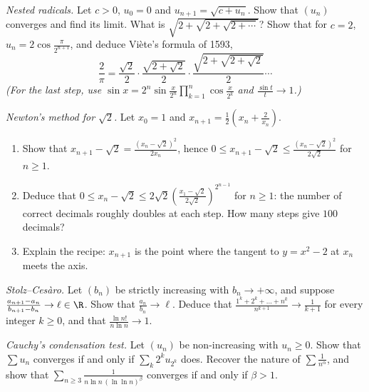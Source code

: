 \begin{exercise}[$\star$]\label{ex:nested}
\emph{Nested radicals.} Let $c>0$, $u_0=0$ and $u_{n+1}=\sqrt{c+u_n}$. Show that $(u_n)$ converges and find its limit. What is $\sqrt{2+\sqrt{2+\sqrt{2+\cdots}}}$? Show that for $c=2$, $u_n=2\cos\frac\pi{2^{n+1}}$, and deduce Vi\`ete's formula of 1593,
\[
\frac2\pi=\frac{\sqrt2}2\cdot\frac{\sqrt{2+\sqrt2}}2\cdot\frac{\sqrt{2+\sqrt{2+\sqrt2}}}2\cdots
\]
\emph{(For the last step, use $\sin x=2^n\sin\frac x{2^n}\prod_{k=1}^n\cos\frac x{2^k}$ and $\frac{\sin t}t\to1$.)}
\end{exercise}

\begin{exercise}[$\star\star$]\label{ex:newton}
\emph{Newton's method for $\sqrt2$.} Let $x_0=1$ and $x_{n+1}=\frac12\left(x_n+\frac2{x_n}\right)$.
\begin{enumerate}[label=(\alph*)]
\item Show that $x_{n+1}-\sqrt2=\frac{(x_n-\sqrt2)^2}{2x_n}$, hence $0\le x_{n+1}-\sqrt2\le\frac{(x_n-\sqrt2)^2}{2\sqrt2}$ for $n\ge1$.
\item Deduce that $0\le x_n-\sqrt2\le2\sqrt2\left(\frac{x_1-\sqrt2}{2\sqrt2}\right)^{2^{n-1}}$ for $n\ge1$: the number of correct decimals roughly doubles at each step. How many steps give $100$ decimals?
\item Explain the recipe: $x_{n+1}$ is the point where the tangent to $y=x^2-2$ at $x_n$ meets the axis.
\end{enumerate}
\end{exercise}

\begin{exercise}[$\star\star$]\label{ex:stolz}
\emph{Stolz--Ces\`aro.} Let $(b_n)$ be strictly increasing with $b_n\to+\infty$, and suppose $\frac{a_{n+1}-a_n}{b_{n+1}-b_n}\to\ell\in\R$. Show that $\frac{a_n}{b_n}\to\ell$.
Deduce that $\frac{1^k+2^k+\dots+n^k}{n^{k+1}}\to\frac1{k+1}$ for every integer $k\ge0$, and that $\frac{\ln n!}{n\ln n}\to1$.
\end{exercise}

\begin{exercise}[$\star\star$]\label{ex:condensation}
\emph{Cauchy's condensation test.} Let $(u_n)$ be non-increasing with $u_n\ge0$. Show that $\sum u_n$ converges if and only if $\sum_k2^ku_{2^k}$ does. Recover
the nature of $\sum\frac1{n^\alpha}$, and show that $\sum_{n\ge3}\frac1{n\ln n\,(\ln\ln n)^\beta}$ converges if and only if $\beta>1$.
\end{exercise}

